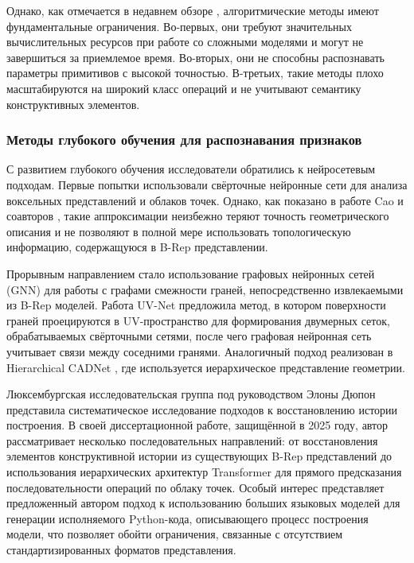 Однако, как отмечается в недавнем обзоре \cite{kim2023reconstruction}, алгоритмические методы имеют фундаментальные ограничения. Во-первых, они требуют значительных вычислительных ресурсов при работе со сложными моделями и могут не завершиться за приемлемое время. Во-вторых, они не способны распознавать параметры примитивов с высокой точностью. В-третьих, такие методы плохо масштабируются на широкий класс операций и не учитывают семантику конструктивных элементов.

\subsubsection{Методы глубокого обучения для распознавания признаков}

С развитием глубокого обучения исследователи обратились к нейросетевым подходам. Первые попытки использовали свёрточные нейронные сети для анализа воксельных представлений и облаков точек. Однако, как показано в работе Cao и соавторов \cite{cao2020brepnet}, такие аппроксимации неизбежно теряют точность геометрического описания и не позволяют в полной мере использовать топологическую информацию, содержащуюся в B-Rep представлении.

Прорывным направлением стало использование графовых нейронных сетей (GNN) для работы с графами смежности граней, непосредственно извлекаемыми из B-Rep моделей. Работа UV-Net \cite{jayaraman2021uvnet} предложила метод, в котором поверхности граней проецируются в UV-пространство для формирования двумерных сеток, обрабатываемых свёрточными сетями, после чего графовая нейронная сеть учитывает связи между соседними гранями. Аналогичный подход реализован в Hierarchical CADNet \cite{zhang2022hierarchical}, где используется иерархическое представление геометрии.

Люксембургская исследовательская группа под руководством Элоны Дюпон \cite{dupont2025design} представила систематическое исследование подходов к восстановлению истории построения. В своей диссертационной работе, защищённой в 2025 году, автор рассматривает несколько последовательных направлений: от восстановления элементов конструктивной истории из существующих B-Rep представлений до использования иерархических архитектур Transformer для прямого предсказания последовательности операций по облаку точек. Особый интерес представляет предложенный автором подход к использованию больших языковых моделей для генерации исполняемого Python-кода, описывающего процесс построения модели, что позволяет обойти ограничения, связанные с отсутствием стандартизированных форматов представления.

